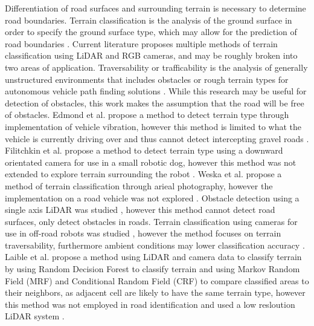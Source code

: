 \documentclass[numbered,pdftex]{ohio-etd}
\begin{document}
{{		{Differentiation of road surfaces and surrounding terrain is necessary to determine road boundaries. Terrain classification is the analysis of the ground surface in order to specify the ground surface type, which may allow for the prediction of road boundaries \cite{laible_3d_2012,laible_terrain_2013,laible_map_building,rasmussen_combining_2002,reymann_improving_2015,walas_terrain_2014,wietrzykowski_boosting_2014,wang_road_nodate}. Current literature proposes multiple methods of terrain classification using LiDAR and RGB cameras, and may be roughly broken into two areas of application. Traversability or trafficability is the analysis of generally unstructured environments that includes obstacles or rough terrain types for autonomous vehicle path finding solutions  \cite{schilling_geometric_2017,ojeda_terrain_2006,coombs_driving_2000,stavens_self-supervised_nodate,belter_rough_2010,bartoszyk_terrain-aware_2017,noauthor_fusion_nodate,li_rugged_2019,wilson_terrain_2014,siva_robot_2019}. While this research may be useful for detection of obstacles, this work makes the assumption that the road will be free of obstacles. Edmond et al. propose a method to detect terrain type through implementation of vehicle vibration, however this method is limited to what the vehicle is currently driving over and thus cannot detect intercepting gravel roads \cite{dupont_online_2008}. Filitchkin et al. propose a method to detect terrain type using a downward orientated camera for use in a small robotic dog, however this method was not extended to explore terrain surrounding the robot \cite{filitchkin_feature_based_2012}. Weska et al. propose a method of terrain classification through arieal photography, however the implementation on a road vehicle was not explored \cite{weszka_comparative_1976}. Obstacle detection using a single axis LiDAR was studied \cite{manduchi_obstacle_2005}, however this method cannot detect road surfaces, only detect obstacles in roads. Terrain classification using cameras for use in off-road robots was studied \cite{walch_offroad_2022}, however the method focuses on terrain traversability, furthermore ambient conditions may lower classification accuracy \cite{levi_3d_2012_light}. Laible et al. propose a method using LiDAR and camera data to classify terrain by using Random Decision Forest to classify terrain and using Markov Random Field (MRF) and Conditional Random Field (CRF) to compare classified areas to their neighbors, as adjacent cell are likely to have the same terrain type, however this method was not employed in road identification and used a low resloution LiDAR system \cite{chellappa_classification_1985,wallach_conditional_nodate,haselich_terrain_2011,zhao_fusion_2014}.}
			
}}
\end{document}
